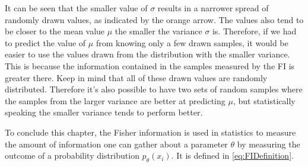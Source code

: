 It can be seen that the smaller value of $\sigma$ results in a narrower spread of randomly drawn values, as indicated by the orange arrow. The values also tend to be closer to the mean value $\mu$ the smaller the variance $\sigma$ is. Therefore, if we had to predict the value of $\mu$ from knowing only a few drawn samples, it would be easier to use the values drawn from the distribution with the smaller variance. This is because the information contained in the samples measured by the FI is greater there. Keep in mind that all of these drawn values are randomly distributed. Therefore it's also possible to have two sets of random samples where the samples from the larger variance are better at predicting $\mu$, but statistically speaking the smaller variance tends to perform better.

To conclude this chapter, the Fisher information is used in statistics to measure the amount of information one can gather about a parameter $\theta$ by measuring the outcome of a probability distribution $p_\theta(x_i)$. It is defined in \cref{eq:FIDefinition}.
